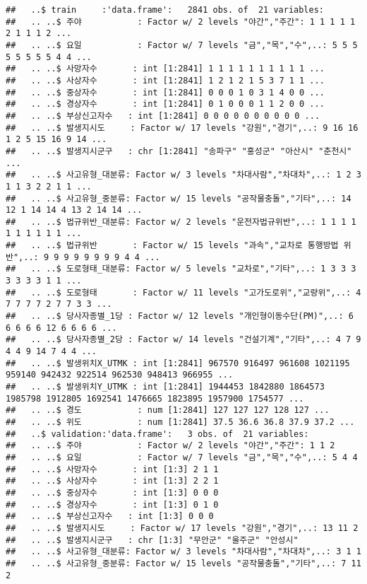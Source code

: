\documentclass[]{article}
\begin{document}
\begin{verbatim}
##   ..$ train     :'data.frame':   2841 obs. of  21 variables:
##   .. ..$ 주야           : Factor w/ 2 levels "야간","주간": 1 1 1 1 1 2 1 1 1 2 ...
##   .. ..$ 요일           : Factor w/ 7 levels "금","목","수",..: 5 5 5 5 5 5 5 5 4 4 ...
##   .. ..$ 사망자수       : int [1:2841] 1 1 1 1 1 1 1 1 1 1 ...
##   .. ..$ 사상자수       : int [1:2841] 1 2 1 2 1 5 3 7 1 1 ...
##   .. ..$ 중상자수       : int [1:2841] 0 0 0 1 0 3 1 4 0 0 ...
##   .. ..$ 경상자수       : int [1:2841] 0 1 0 0 0 1 1 2 0 0 ...
##   .. ..$ 부상신고자수   : int [1:2841] 0 0 0 0 0 0 0 0 0 0 ...
##   .. ..$ 발생지시도     : Factor w/ 17 levels "강원","경기",..: 9 16 16 1 2 5 15 16 9 14 ...
##   .. ..$ 발생지시군구   : chr [1:2841] "송파구" "홍성군" "아산시" "춘천시" ...
##   .. ..$ 사고유형_대분류: Factor w/ 3 levels "차대사람","차대차",..: 1 2 3 1 1 3 2 2 1 1 ...
##   .. ..$ 사고유형_중분류: Factor w/ 15 levels "공작물충돌","기타",..: 14 12 1 14 14 4 13 2 14 14 ...
##   .. ..$ 법규위반_대분류: Factor w/ 2 levels "운전자법규위반",..: 1 1 1 1 1 1 1 1 1 1 ...
##   .. ..$ 법규위반       : Factor w/ 15 levels "과속","교차로 통행방법 위반",..: 9 9 9 9 9 9 9 9 4 4 ...
##   .. ..$ 도로형태_대분류: Factor w/ 5 levels "교차로","기타",..: 1 3 3 3 3 3 3 3 1 1 ...
##   .. ..$ 도로형태       : Factor w/ 11 levels "고가도로위","교량위",..: 4 7 7 7 7 2 7 7 3 3 ...
##   .. ..$ 당사자종별_1당 : Factor w/ 12 levels "개인형이동수단(PM)",..: 6 6 6 6 6 12 6 6 6 6 ...
##   .. ..$ 당사자종별_2당 : Factor w/ 14 levels "건설기계","기타",..: 4 7 9 4 4 9 14 7 4 4 ...
##   .. ..$ 발생위치X_UTMK : int [1:2841] 967570 916497 961608 1021195 959140 942432 922514 962530 948413 966955 ...
##   .. ..$ 발생위치Y_UTMK : int [1:2841] 1944453 1842880 1864573 1985798 1912805 1692541 1476665 1823895 1957900 1754577 ...
##   .. ..$ 경도           : num [1:2841] 127 127 127 128 127 ...
##   .. ..$ 위도           : num [1:2841] 37.5 36.6 36.8 37.9 37.2 ...
##   ..$ validation:'data.frame':   3 obs. of  21 variables:
##   .. ..$ 주야           : Factor w/ 2 levels "야간","주간": 1 1 2
##   .. ..$ 요일           : Factor w/ 7 levels "금","목","수",..: 5 4 4
##   .. ..$ 사망자수       : int [1:3] 2 1 1
##   .. ..$ 사상자수       : int [1:3] 2 2 1
##   .. ..$ 중상자수       : int [1:3] 0 0 0
##   .. ..$ 경상자수       : int [1:3] 0 1 0
##   .. ..$ 부상신고자수   : int [1:3] 0 0 0
##   .. ..$ 발생지시도     : Factor w/ 17 levels "강원","경기",..: 13 11 2
##   .. ..$ 발생지시군구   : chr [1:3] "무안군" "울주군" "안성시"
##   .. ..$ 사고유형_대분류: Factor w/ 3 levels "차대사람","차대차",..: 3 1 1
##   .. ..$ 사고유형_중분류: Factor w/ 15 levels "공작물충돌","기타",..: 7 11 2

\end{verbatim}
\end{document}
